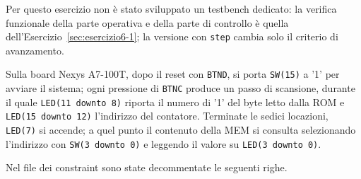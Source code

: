 
\simulazione

Per questo esercizio non è stato sviluppato un testbench dedicato: la verifica funzionale della parte operativa e della parte di controllo è quella dell'Esercizio~\ref{sec:esercizio6-1}; la versione con \texttt{step} cambia solo il criterio di avanzamento.

\sintesiboard

Sulla board Nexys A7-100T, dopo il reset con \texttt{BTND}, si porta \texttt{SW(15)} a '1' per avviare il sistema; ogni pressione di \texttt{BTNC} produce un passo di scansione, durante il quale \texttt{LED(11 downto 8)} riporta il numero di '1' del byte letto dalla ROM e \texttt{LED(15 downto 12)} l'indirizzo del contatore. Terminate le sedici locazioni, \texttt{LED(7)} si accende; a quel punto il contenuto della MEM si consulta selezionando l'indirizzo con \texttt{SW(3 downto 0)} e leggendo il valore su \texttt{LED(3 downto 0)}.

Nel file dei constraint sono state decommentate le seguenti righe.

